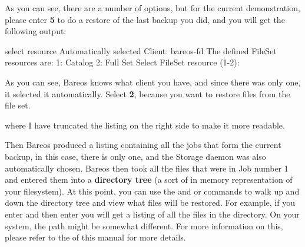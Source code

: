 As you can see, there are a number of options, but for the current
demonstration, please enter {\bf 5} to do a restore of the last backup you
did, and you will get the following output:

\footnotesize
\begin{bconsole}{select resource}
Automatically selected Client: bareos-fd
The defined FileSet resources are:
     1: Catalog
     2: Full Set
Select FileSet resource (1-2): 
\end{bconsole}
\normalsize

As you can see, Bareos knows what client
you have, and since there was only one, it selected it automatically.
Select {\bf 2}, because you want to restore files from the file set.

\footnotesize
{}
\normalsize

where I have truncated the listing on the right side to make it more readable.

Then Bareos produced a listing containing all the jobs that
form the current backup, in this case, there is only one, and the Storage
daemon was also automatically chosen. Bareos then took all the files that were
in Job number 1 and entered them into a {\bf directory tree} (a sort of in
memory representation of your filesystem). At this point, you can use the 
 and  or  commands to walk up and down the directory tree
and view what files will be restored. For example, if you enter 
and then enter  you will get a listing
of all the files in the  directory.
On your system, the path might be somewhat different.
For more information on this, please refer to the
 of this manual for
more details.

